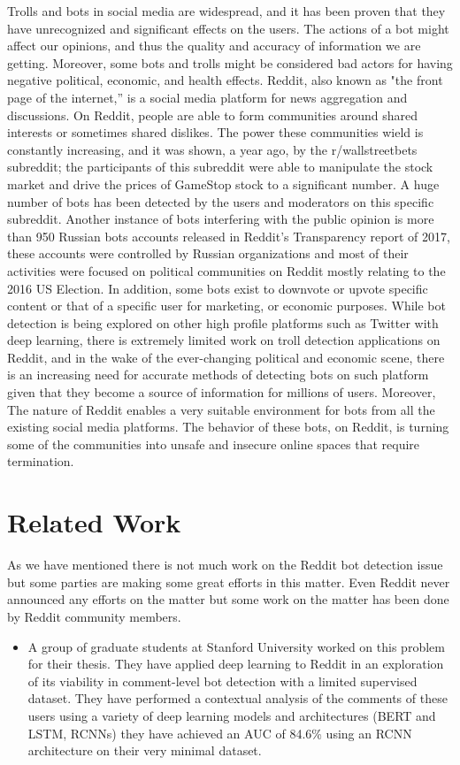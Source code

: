 \documentclass{article}
\begin{document}
Trolls and bots in social media are widespread, and it has been proven that they have unrecognized and significant effects on the users. The actions of a bot might affect our opinions, and thus the quality and accuracy of information we are getting. Moreover, some bots and trolls might be considered bad actors for having negative political, economic, and health effects.
Reddit, also known as "the front page of the internet,” is a social media platform for news aggregation and discussions. On Reddit, people are able to form communities around shared interests or sometimes shared dislikes. The power these communities wield is constantly increasing, and it was shown, a year ago, by the r/wallstreetbets subreddit; the participants of this subreddit were able to manipulate the stock market and drive the prices of GameStop stock to a significant number. A huge number of bots has been detected by the users and moderators on this specific subreddit. Another instance of bots interfering with the public opinion is more than 950 Russian bots accounts released in Reddit's Transparency report of 2017, these accounts were controlled by Russian organizations and most of their activities were focused on political communities on Reddit mostly relating to the 2016 US Election. In addition, some bots exist to downvote or upvote specific content or that of a specific user for marketing, or economic purposes. While bot detection is being explored on other high profile platforms such as Twitter
with deep learning, there is extremely limited work on troll detection applications on Reddit, and in the wake of the ever-changing political and economic scene, there is an increasing need for accurate methods of detecting bots on such platform given that they become a source of information for millions of users. Moreover, The nature of Reddit enables a very suitable environment for bots from all the existing social media platforms. The behavior of these bots, on Reddit, is turning some of the communities into unsafe and insecure online spaces that require termination.

\section{Related Work}
As we have mentioned there is not much work on the Reddit bot detection issue but some parties are making some great efforts in this matter. Even Reddit never announced any efforts on the matter but some work on the matter has been done by Reddit community members.
    \begin{itemize}
        \item A group of graduate students at Stanford University worked on this problem for their thesis. They have applied deep learning to Reddit in an exploration of its viability in comment-level bot detection with a limited supervised dataset. They have performed a contextual analysis of the comments of these users using a variety of deep learning models and architectures (BERT and LSTM, RCNNs) they have achieved an AUC of 84.6\% using an RCNN architecture on their very minimal dataset.
    \end{itemize}
    
\end{document}
